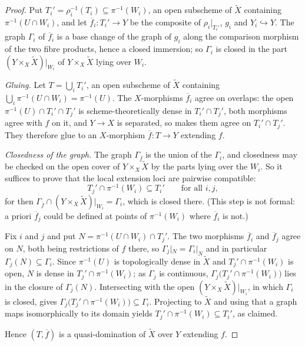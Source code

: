\begin{proof}
  Put $T_i'=\rho_i^{-1}(T_i)\subseteq\pi^{-1}(W_i)$, an open subscheme of
  $\widetilde X$ containing $\pi^{-1}(U\cap W_i)$, and let
  $\overline f_i\colon T_i'\to Y$ be the composite of $\rho_i|_{T_i'}$, $g_i$
  and $Y_i\hookrightarrow Y$.  The graph $\Gamma_i$ of $\overline f_i$ is a
  base change of the graph of $g_i$ along the comparison morphism of the two
  fibre products, hence a closed immersion; so $\Gamma_i$ is closed in the part
  $(Y\times_X\widetilde X)|_{W_i}$ of $Y\times_X\widetilde X$ lying over
  $W_i$.

  \emph{Gluing.}  Let $T=\bigcup_iT_i'$, an open subscheme of $\widetilde X$
  containing $\bigcup_i\pi^{-1}(U\cap W_i)=\pi^{-1}(U)$.  The $X$-morphisms
  $\overline f_i$ agree on overlaps: the open $\pi^{-1}(U)\cap T_i'\cap T_j'$
  is scheme-theoretically dense in $T_i'\cap T_j'$, both morphisms agree with
  $f$ on it, and $Y\to X$ is separated, so
   makes them
  agree on $T_i'\cap T_j'$.  They therefore glue to an $X$-morphism
  $\overline f\colon T\to Y$ extending $f$.

  \emph{Closedness of the graph.}  The graph $\Gamma_{\overline f}$ is the
  union of the $\Gamma_i$, and closedness may be checked on the open cover of
  $Y\times_X\widetilde X$ by the parts lying over the $W_i$.  So it suffices to
  prove that the local extension loci are pairwise compatible:
  \[
    T_j'\cap\pi^{-1}(W_i)\subseteq T_i'\qquad\text{for all }i,j,
  \]
  for then $\Gamma_{\overline f}\cap(Y\times_X\widetilde X)|_{W_i}=\Gamma_i$,
  which is closed there.  (This step is not formal: a priori
  $\overline f_j$ could be defined at points of $\pi^{-1}(W_i)$ where
  $\overline f_i$ is not.)

  Fix $i$ and $j$ and put $N=\pi^{-1}(U\cap W_i)\cap T_j'$.  The two morphisms
  $\overline f_i$ and $\overline f_j$ agree on $N$, both being restrictions of
  $f$ there, so $\Gamma_j|_N=\Gamma_i|_N$ and in particular
  $\Gamma_j(N)\subseteq\Gamma_i$.  Since $\pi^{-1}(U)$ is topologically dense
  in $\widetilde X$ and $T_j'\cap\pi^{-1}(W_i)$ is open, $N$ is dense in
  $T_j'\cap\pi^{-1}(W_i)$; as $\Gamma_j$ is continuous,
  $\Gamma_j\bigl(T_j'\cap\pi^{-1}(W_i)\bigr)$ lies in the closure of
  $\Gamma_j(N)$.  Intersecting with the open
  $(Y\times_X\widetilde X)|_{W_i}$, in which $\Gamma_i$ is closed, gives
  $\Gamma_j\bigl(T_j'\cap\pi^{-1}(W_i)\bigr)\subseteq\Gamma_i$.  Projecting to
  $\widetilde X$ and using that a graph maps isomorphically to its domain
  yields $T_j'\cap\pi^{-1}(W_i)\subseteq T_i'$, as claimed.

  Hence $(T,\overline f)$ is a quasi-domination of $\widetilde X$ over $Y$
  extending $f$.
\end{proof}

